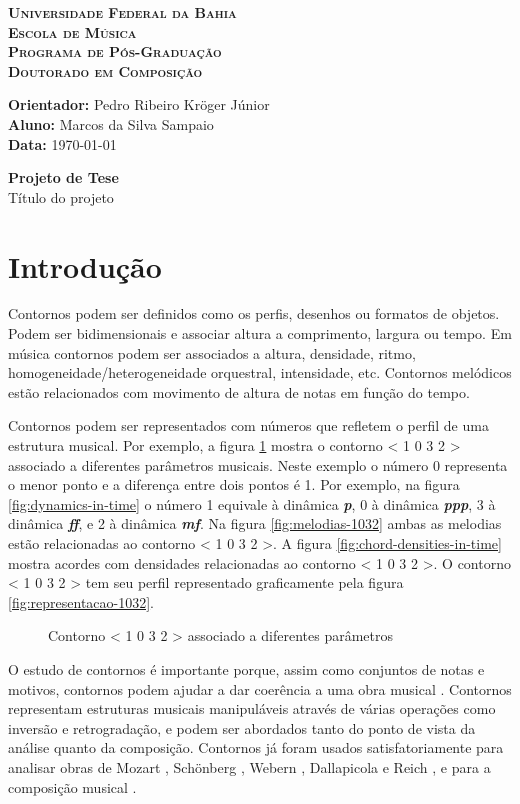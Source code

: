 \documentclass[12pt]{article}
\newcommand{\cabecalho}[0]{
  \textbf{\textsc{Universidade Federal da Bahia}} \\
  \textbf{\textsc{Escola de Música}} \\
  \textbf{\textsc{Programa de Pós-Graduação}} \\
  \textbf{\textsc{Doutorado em Composição}} \par
  \vspace*{1ex}
  \textbf{Orientador:} Pedro Ribeiro Kröger Júnior\\
  \textbf{Aluno: } Marcos da Silva Sampaio \\
  \textbf{Data: } \today
  \thispagestyle{empty}
}
\newcommand{\titulo}[1]{
  \vspace{1cm}
  \begin{center}{
      \Huge \textbf{Projeto de Tese} \\
    }
    \vspace{12pt}
    {\Large #1}
  \end{center}
  \vspace{1cm}
}
\begin{document}
\cabecalho
\titulo{Título do projeto}

\section{Introdução}
\label{sec:introducao}

Contornos podem ser definidos como os perfis, desenhos ou formatos de
objetos. Podem ser bidimensionais e associar altura a comprimento,
largura ou tempo. Em música contornos podem ser associados a altura,
densidade, ritmo, homogeneidade/heterogeneidade orquestral,
intensidade, etc. Contornos melódicos estão relacionados com movimento
de altura de notas em função do tempo.

Contornos podem ser representados com números que refletem o perfil de
uma estrutura musical. Por exemplo, a figura \ref{fig:representacoes}
mostra o contorno < 1 0 3 2 > associado a diferentes parâmetros
musicais. Neste exemplo o número 0 representa o menor ponto e a
diferença entre dois pontos é 1. Por exemplo, na figura
\ref{fig:dynamics-in-time} o número 1 equivale à dinâmica
\textbf{\textit{p}}, 0 à dinâmica \textbf{\textit{ppp}}, 3 à dinâmica
\textbf{\textit{ff}}, e 2 à dinâmica \textbf{\textit{mf}}. Na figura
\ref{fig:melodias-1032} ambas as melodias estão relacionadas ao
contorno < 1 0 3 2 >. A figura \ref{fig:chord-densities-in-time} mostra
acordes com densidades relacionadas ao contorno < 1 0 3 2 >. O contorno
< 1 0 3 2 > tem seu perfil representado graficamente pela figura
\ref{fig:representacao-1032}.

\begin{figure}[h]
  \centering
  \quad

  \subfloat[Altura]{
    \texttt{[image: ly-1032]}
    \label{fig:melodias-1032}
  }
  \caption{Contorno < 1 0 3 2 > associado a diferentes parâmetros}
  \label{fig:representacoes}
\end{figure}

O estudo de contornos é importante porque, assim como conjuntos de
notas e motivos, contornos podem ajudar a dar coerência a uma obra
musical \cite{clifford95:contour}. Contornos representam estruturas
musicais manipuláveis através de várias operações como inversão e
retrogradação, e podem ser abordados tanto do ponto de vista da
análise quanto da composição. Contornos já foram usados
satisfatoriamente para analisar obras de Mozart
\cite{beard03:contour}, Schönberg \cite{friedmann85:methodology},
Webern \cite{clifford95:contour,sampaio08:analise}, Dallapicola
\cite{marvin88:generalized} e Reich \cite{quinn97:fuzzy}, e para a
composição musical \cite{sampaio08:em}.
\end{document}
